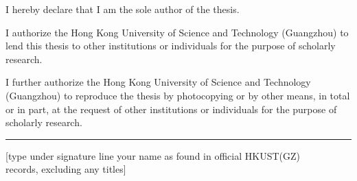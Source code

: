 \begin{authorization}
\vspace{2\baselineskip}

I hereby declare that I am the sole author of the thesis.

\vspace{2\baselineskip}
I authorize the Hong Kong University of Science and Technology (Guangzhou) to lend this thesis to other institutions or individuals for the purpose of scholarly research.

\vspace{2\baselineskip}
I further authorize the Hong Kong University of Science and Technology (Guangzhou) to reproduce the thesis by photocopying or by other means, in total or in part, at the request of other institutions or individuals for the purpose of scholarly research.

\vspace{8\baselineskip}
\begin{center}
\rule{0.5\textwidth}{0.5pt} %
\end{center}
\begin{center}
[type under signature line your name as found in official HKUST(GZ) \\
records, excluding any titles]
\end{center}
\end{authorization}
